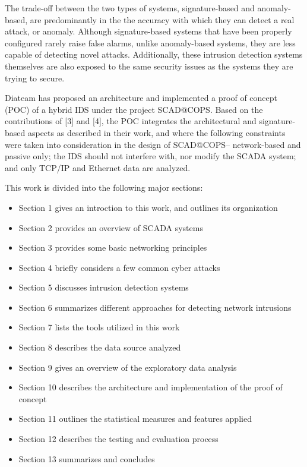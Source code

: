 \documentclass[11pt,]{article}
\begin{document}
The trade-off between the two types of systems, signature-based and
anomaly-based, are predominantly in the the accuracy with which they can
detect a real attack, or anomaly. Although signature-based systems that
have been properly configured rarely raise false alarms, unlike
anomaly-based systems, they are less capable of detecting novel attacks.
Additionally, these intrusion detection systems themselves are also
exposed to the same security issues as the systems they are trying to
secure.

Diateam has proposed an architecture and implemented a proof of concept
(POC) of a hybrid IDS under the project SCAD@COPS. Based on the
contributions of {[}3{]} and {[}4{]}, the POC integrates the
architectural and signature-based aspects as described in their work,
and where the following constraints were taken into consideration in the
design of SCAD@COPS-- network-based and passive only; the IDS should not
interfere with, nor modify the SCADA system; and only TCP/IP and
Ethernet data are analyzed.

This work is divided into the following major sections:

\begin{itemize}
\itemsep1pt\parskip0pt
\item
  Section 1 gives an introction to this work, and outlines its
  organization
\item
  Section 2 provides an overview of SCADA systems
\item
  Section 3 provides some basic networking principles
\item
  Section 4 briefly considers a few common cyber attacks
\item
  Section 5 discusses intrusion detection systems
\item
  Section 6 summarizes different approaches for detecting network
  intrusions
\item
  Section 7 lists the tools utilized in this work
\item
  Section 8 describes the data source analyzed
\item
  Section 9 gives an overview of the exploratory data analysis
\item
  Section 10 describes the architecture and implementation of the proof
  of concept
\item
  Section 11 outlines the statistical measures and features applied
\item
  Section 12 describes the testing and evaluation process
\item
  Section 13 summarizes and concludes
\end{itemize}
\end{document}
